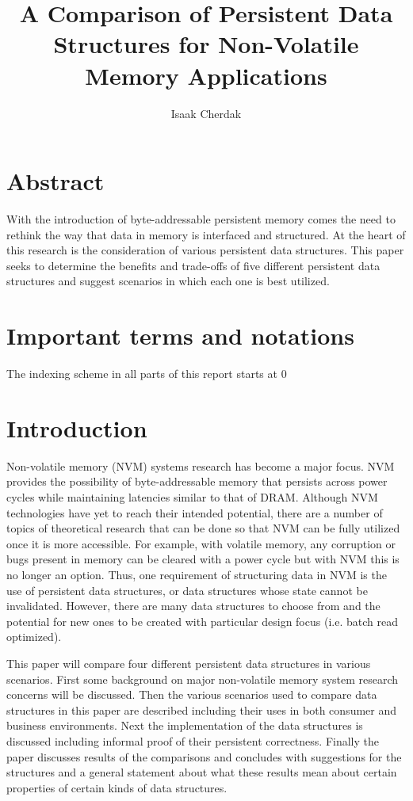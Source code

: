 \documentclass[twocolumn]{article}
\title{A Comparison of Persistent Data Structures for Non-Volatile Memory
Applications}
\author{Isaak Cherdak}
\begin{document}
\maketitle

\section*{Abstract}

With the introduction of byte-addressable persistent memory comes the need to
rethink the way that data in memory is interfaced and structured. At the heart
of this research is the consideration of various persistent data structures.
This paper seeks to determine the benefits and trade-offs of five different
persistent data structures and suggest scenarios in which each one is best
utilized.

\pagebreak

\section*{Important terms and notations}


The indexing scheme in all parts of this report starts at 0


\section{Introduction}

Non-volatile memory (NVM) systems research has become a major focus. NVM
provides the possibility of byte-addressable memory that persists across power
cycles while maintaining latencies similar to that of DRAM. Although NVM
technologies have yet to reach their intended potential, there are a number of
topics of theoretical research that can be done so that NVM can be fully
utilized once it is more accessible. For example, with volatile memory, any
corruption or bugs present in memory can be cleared with a power cycle but with
NVM this is no longer an option. Thus, one requirement of structuring data in
NVM is the use of persistent data structures, or data structures whose state
cannot be invalidated. However, there are many data structures to choose from
and the potential for new ones to be created with particular design focus (i.e.
batch read optimized).

This paper will compare four different persistent data structures in various
scenarios. First some background on major non-volatile memory system research
concerns will be discussed. Then the various scenarios used to compare data
structures in this paper are described including their uses in both consumer and
business environments. Next the implementation of the data structures is
discussed including informal proof of their persistent correctness. Finally the
paper discusses results of the comparisons and concludes with suggestions for
the structures and a general statement about what these results mean about
certain properties of certain kinds of data structures.
\end{document}
